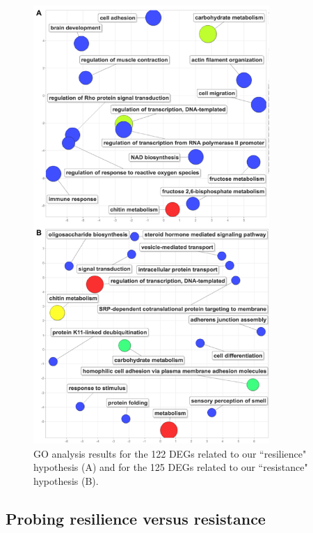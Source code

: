 \documentclass[11pt,a4paper,oldfontcommands,openany]{memoir}
\numberwithin{equation}{section} %
\begin{document}
\begin{figure}[H]
  \centering
  \begin{framed}
  \includegraphics[width=0.8\textwidth]{Images/revigo}
  \end{framed}
  \caption{GO analysis results for the 122 DEGs related to our ``resilience" hypothesis (A) and for the 125 DEGs related to our ``resistance" hypothesis (B).}
  \label{fig:revigo}
\end{figure}

\subsection{Probing resilience versus resistance}
\end{document}
